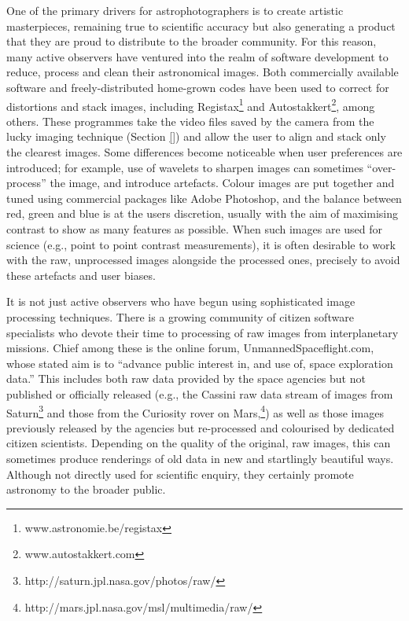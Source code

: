 \documentclass{ar2e}
\begin{document}
One of the primary drivers for astrophotographers is to create artistic
masterpieces, remaining true to scientific accuracy but also generating a
product that they are proud to distribute to the broader community.  For this
reason, many active observers have ventured into the realm of software
development to reduce, process and clean their astronomical images.  Both
commercially available software and freely-distributed home-grown codes have
been used to correct for distortions and stack images, including
Registax\footnote{www.astronomie.be/registax} and
Autostakkert\footnote{www.autostakkert.com}, among others.  These programmes
take the video files saved by the camera from the lucky imaging technique
(Section \ref{}) and allow the user to align and stack only the clearest
images.  Some differences become noticeable when user preferences are
introduced; for example, use of wavelets to sharpen images can sometimes
``over-process'' the image, and introduce artefacts.  Colour images are put
together and tuned using commercial packages like Adobe Photoshop, and the
balance between red, green and blue is at the users discretion, usually with
the aim of maximising contrast to show as many features as possible.  When
such images are used for science (e.g., point to point contrast measurements),
it is often desirable to work with the raw, unprocessed images alongside the
processed ones, precisely to avoid these artefacts and user biases.


It is not just active observers who have begun using sophisticated image
processing techniques.  There is a growing community of citizen software
specialists who devote their time to processing of raw images from
interplanetary missions.  Chief among these is the online forum,
UnmannedSpaceflight.com, whose stated aim is to ``advance public interest in,
and use of, space exploration data.''  This includes both raw data provided by
the space agencies but not published or officially released (e.g., the Cassini
raw data stream of images from
Saturn\footnote{http://saturn.jpl.nasa.gov/photos/raw/} and those from the
Curiosity rover on Mars,\footnote{
http://mars.jpl.nasa.gov/msl/multimedia/raw/}) as well as those images
previously released by the agencies but re-processed and colourised by
dedicated citizen scientists.  Depending on the quality of the original, raw
images, this can sometimes produce renderings of old data in new and
startlingly beautiful ways.  Although not directly used for scientific
enquiry, they certainly promote astronomy to the broader public.
\end{document}
